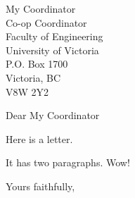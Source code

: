 \documentclass[11pt]{letter}
\begin{document}
\begin{letter}
	{	%
		My Coordinator \\
		Co-op Coordinator \\
		Faculty of Engineering \\ 
		University of Victoria \\
		P.O. Box 1700 \\
		Victoria, BC \\ 
		V8W 2Y2
	}

\opening{Dear My Coordinator}

Here is a letter.

It has two paragraphs. Wow!

\closing{Yours faithfully,}


\end{letter}
\end{document}
